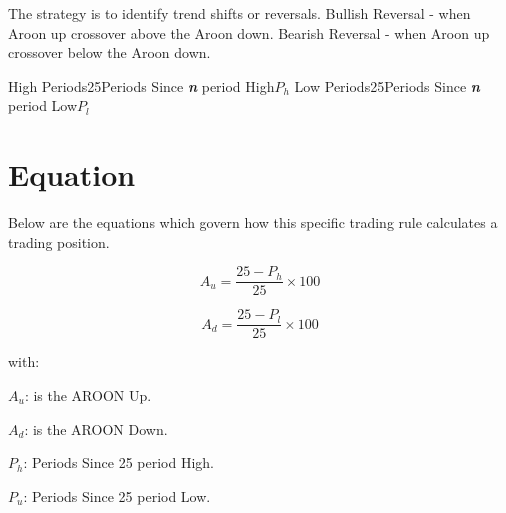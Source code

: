 \documentclass{article}
\begin{document}
\logo
{} %
\tblofcontents


\howtotrade
{The strategy is to identify trend shifts or reversals.
Bullish Reversal - when Aroon up crossover above the Aroon down.
Bearish Reversal - when Aroon up crossover below the Aroon down.
}

{High Periods}{25}{Periods Since \textit{\textbf{n}} period High}{$P_h$}
{Low Periods}{25}{Periods Since \textit{\textbf{n}} period Low}{$P_l$}
\stoptable %


\section{Equation}
Below are the equations which govern how this specific trading rule calculates a trading position.

\begin{equation}
A_u = \frac{25 - P_h}{25} \times 100
\end{equation}

\begin{equation}
A_d = \frac{25 - P_l}{25} \times 100
\end{equation}


with:

$A_u$: is the AROON Up.

$A_d$: is the AROON Down.

$P_h$: Periods Since 25 period High.

$P_u$: Periods Since 25 period Low.


\keyterms
\furtherlinks %
\end{document}
